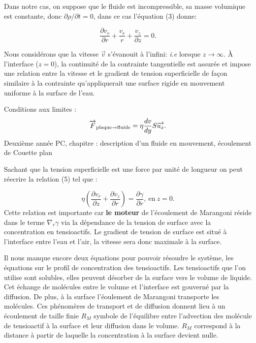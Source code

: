 \documentclass[french, 10pt]{article}
\begin{document}
Dans notre cas, on suppose que le fluide est incompressible, sa masse volumique est constante, donc $\partial \rho/\partial t = 0$, dans ce cas l'équation (3) donne:

\begin{equation}
  \frac{\partial v_r}{\partial r}+\frac{v_r}{r}+\frac{v_z}{\partial z}=0.
\end{equation}

Nous considérons que la vitesse $\vec{v}$ s'évanouit à l'infini: \textit{i.e }lorsque $z\rightarrow \infty$. À l'interface ($z=0$), la continuité de la contrainte tangentielle est assurée et impose une relation entre la vitesse et le gradient de tension superficielle de façon similaire à la contrainte qu'appliquerait une surface rigide en mouvement uniforme à la surface de l'eau.  

\begin{Programme}{Conditions aux limites :}
  \begin{equation}
   \vec{F}_{\rm plaque\rightarrow fluide} = \eta\dfrac{d v}{dy}S\vec{u_x}.\label{eq:conditionauxlimites}
  \end{equation}
  Deuxième année PC, chapitre : description d'un fluide en mouvement, écoulement de Couette plan
\end{Programme}

Sachant que la tension superficielle est une force par unité de longueur on peut réecrire la relation (5) tel que :

\begin{equation}
  \eta\left(\frac{\partial v_r}{\partial z}+\frac{\partial v_z}{\partial r}\right) = \frac{\partial \gamma}{\partial r}, ~\text{en}~z=0.\label{eq:CL}
\end{equation}
Cette relation est importante car  \textbf{le moteur} de l'écoulement de Marangoni réside dans le terme $\nabla_r\gamma$ via la dépendance de la tension de surface avec la concentration en tensioactifs. Le gradient de tension de surface est situé à l'interface entre l'eau et l'air, la vitesse sera donc maximale à la surface.\medskip


Il nous manque encore deux équations pour pouvoir résoudre le système, les équations sur le profil de concentration des tensioactifs. Les tensioactifs que l'on utilise sont solubles, elles peuvent désorber de la surface vers le volume de liquide. Cet échange de molécules entre le volume et l'interface est gouverné par la diffusion. De plus, à la surface l'éoulement de Marangoni transporte les molécules. Ces phénomères de transport et de diffusion donnent lieu à un écoulement de taille finie $R_M$ symbole de l'équilibre entre l'advection des molécule de tensioactif à la surface et leur diffusion dans le volume. $R_M$ correspond à la distance à partir de laquelle la concentration à la surface devient nulle.\bigskip 
\end{document}
